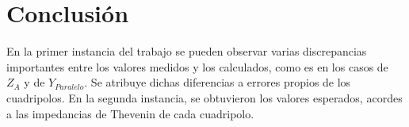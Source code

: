 \documentclass[a4paper]{article}
\begin{document}
\section*{Conclusión}

En la primer instancia del trabajo se pueden observar varias discrepancias importantes entre los valores medidos y los calculados, como es en los casos de $Z_A$ y de $Y_{Paralelo}$. Se atribuye dichas diferencias a errores propios de los cuadripolos.
En la segunda instancia, se obtuvieron los valores esperados, acordes a las impedancias de Thevenin de cada cuadripolo.
\end{document}

